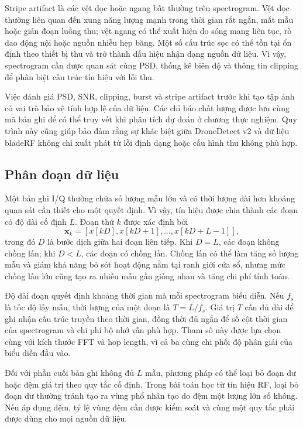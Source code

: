 \documentclass[../DoAn.tex]{subfiles}
\begin{document}
Stripe artifact là các vệt dọc hoặc ngang bất thường trên spectrogram. Vệt dọc thường liên quan đến xung năng lượng mạnh trong thời gian rất ngắn, mất mẫu hoặc gián đoạn luồng thu; vệt ngang có thể xuất hiện do sóng mang liên tục, rò dao động nội hoặc nguồn nhiễu hẹp băng. Một số cấu trúc sọc có thể tồn tại ổn định theo thiết bị thu và trở thành dấu hiệu nhận dạng nguồn dữ liệu. Vì vậy, spectrogram cần được quan sát cùng PSD, thống kê biên độ và thông tin clipping để phân biệt cấu trúc tín hiệu với lỗi thu.

Việc đánh giá PSD, SNR, clipping, burst và stripe artifact trước khi tạo tập ảnh có vai trò bảo vệ tính hợp lệ của dữ liệu. Các chỉ báo chất lượng được lưu cùng mã bản ghi để có thể truy vết khi phân tích dự đoán ở chương thực nghiệm. Quy trình này cũng giúp bảo đảm rằng sự khác biệt giữa DroneDetect v2 và dữ liệu bladeRF không chỉ xuất phát từ lỗi định dạng hoặc cấu hình thu không phù hợp.

\subsection{Phân đoạn dữ liệu}

Một bản ghi I/Q thường chứa số lượng mẫu lớn và có thời lượng dài hơn khoảng quan sát cần thiết cho một quyết định. Vì vậy, tín hiệu được chia thành các đoạn có độ dài cố định $L$. Đoạn thứ $k$ được xác định bởi
\begin{equation}
    \mathbf{x}_{k}
    =
    \left[
        x[kD],x[kD+1],\ldots,x[kD+L-1]
    \right],
\end{equation}
trong đó $D$ là bước dịch giữa hai đoạn liên tiếp. Khi $D=L$, các đoạn không chồng lấn; khi $D<L$, các đoạn có chồng lấn. Chồng lấn có thể làm tăng số lượng mẫu và giảm khả năng bỏ sót hoạt động nằm tại ranh giới cửa sổ, nhưng mức chồng lấn lớn cũng tạo ra nhiều mẫu gần giống nhau và tăng chi phí tính toán.

Độ dài đoạn quyết định khoảng thời gian mà mỗi spectrogram biểu diễn. Nếu $f_s$ là tốc độ lấy mẫu, thời lượng của một đoạn là $T=L/f_s$. Giá trị $T$ cần đủ dài để ghi nhận cấu trúc truyền theo thời gian, đồng thời đủ ngắn để số cột thời gian của spectrogram và chi phí bộ nhớ vẫn phù hợp. Tham số này được lựa chọn cùng với kích thước FFT và hop length, vì cả ba cùng chi phối độ phân giải của biểu diễn đầu vào.

Đối với phần cuối bản ghi không đủ $L$ mẫu, phương pháp có thể loại bỏ đoạn dư hoặc đệm giá trị theo quy tắc cố định. Trong bài toán học từ tín hiệu RF, loại bỏ đoạn dư thường tránh tạo ra vùng phổ nhân tạo do đệm một lượng lớn số không. Nếu áp dụng đệm, tỷ lệ vùng đệm cần được kiểm soát và cùng một quy tắc phải được dùng cho mọi nguồn dữ liệu.
\end{document}
